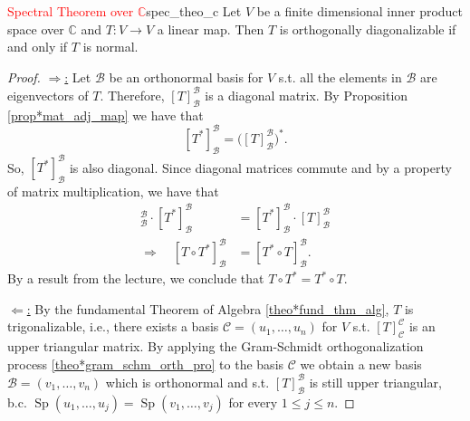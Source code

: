 \begin{theorem}{\textcolor{red}{Spectral Theorem over $\mathbb{C}$}}{spec_theo_c}
	Let $V$ be a finite dimensional inner product space over $\mathbb{C}$ and $T:V \to V$ a linear map. Then $T$ is orthogonally diagonalizable if and only if $T$ is normal.
\end{theorem}

\begin{proof}
	\underline{$\Longrightarrow$:} Let $\mathcal{B}$ be an orthonormal basis for $V$ s.t. all the elements in $\mathcal{B}$ are eigenvectors of $T$. Therefore, $[T]^{\mathcal{B}}_{\mathcal{B}}$ is a diagonal matrix. By Proposition \ref{prop*mat_adj_map} we have that
	\[
		[T^*]^{\mathcal{B}}_{\mathcal{B}} = \big([T]^{\mathcal{B}}_{\mathcal{B}}\big)^*.
	\]
	So, $[T^*]^{\mathcal{B}}_{\mathcal{B}}$ is also diagonal. Since diagonal matrices commute and by a property of matrix multiplication, we have that
	\begin{align*}
		[T]^{\mathcal{B}}_{\mathcal{B}} \cdot [T^*]^{\mathcal{B}}_{\mathcal{B}} &= [T^*]^{\mathcal{B}}_{\mathcal{B}} \cdot [T]^{\mathcal{B}}_{\mathcal{B}}\\
		\Longrightarrow \quad [T \circ T^*]^{\mathcal{B}}_{\mathcal{B}} &= [T^*\circ T]^{\mathcal{B}}_{\mathcal{B}}.
	\end{align*}
	By a result from the lecture, we conclude that $T\circ T^* = T^*\circ T$.
	
	\underline{$\Longleftarrow$:} By the fundamental Theorem of Algebra \ref{theo*fund_thm_alg}, $T$ is trigonalizable, i.e., there exists a basis $\mathcal{C} = (u_1, \hdots , u_n)$ for $V$ s.t. $[T]^{\mathcal{C}}_{\mathcal{C}}$ is an upper triangular matrix. By applying the Gram-Schmidt orthogonalization process \ref{theo*gram_schm_orth_pro} to the basis $\mathcal{C}$ we obtain a new basis $\mathcal{B} = (v_1, \hdots , v_n)$ which is orthonormal and s.t. $[T]^\mathcal{B}_\mathcal{B}$ is still upper triangular, b.c. $\operatorname{Sp}(u_1, \hdots , u_j) = \operatorname{Sp}(v_1, \hdots , v_j)$ for every $1 \leq j \leq n$.
	

\end{proof}

